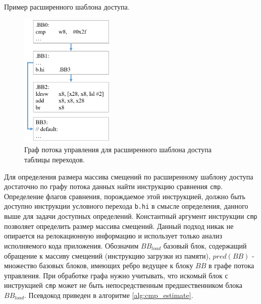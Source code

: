 \documentclass{mipt-thesis-bs}
\begin{document}
    \begin{listing}[h!]
        \inputminted{gas}{src/ext_template.s}
        \caption{Пример расширенного шаблона доступа.}
        \label{fig:ext-acc-template}
    \end{listing}

    \begin{figure}[h!]
        \centering
        \includegraphics[width=0.4\textwidth]{pics/ext-template-cfg.png}
        \caption{Граф потока управления для расширенного шаблона доступа таблицы переходов.}
        \label{fig:ext-template-cfg}
    \end{figure}

    Для определения размера массива смещений по расширенному шаблону доступа достаточно по графу потока данных найти инструкцию сравнения \verb|cmp|. Определение флагов сравнения, порождаемое этой инструкцией, должно быть доступно инструкции условного перехода \verb|b.hi| в смысле определения, данного выше для задачи доступных определений. Константный аргумент инструкции \verb|cmp| позволяет определить размер массива смещений. Данный подход никак не опирается на релокационную информацию и использует только анализ исполняемого кода приложения. Обозначим $BB_{load}$ базовый блок, содержащий обращение к массиву смещений (инструкцию загрузки из памяти), $pred(BB)$ - множество базовых блоков, имеющих ребро ведущее к блоку $BB$ в графе потока управления. При обработке графа нужно учитывать, что искомый блок с инструкцией \verb|cmp| может не быть непосредственным предшественником блока $BB_{load}$. Псевдокод приведен в алгоритме \ref{alg:cmp_estimate}.
\end{document}
